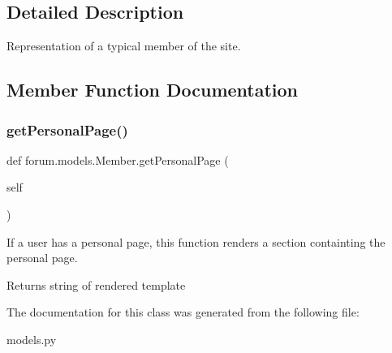 \subsection{Detailed Description}
Representation of a typical member of the site. 

\subsection{Member Function Documentation}
\mbox{\label{classforum_1_1models_1_1_member_ad7b529a832888707060ec31fd05a0809}} 
\subsubsection{\texorpdfstring{get\+Personal\+Page()}{getPersonalPage()}}
{\footnotesize\ttfamily def forum.\+models.\+Member.\+get\+Personal\+Page (\begin{DoxyParamCaption}\item[{}]{self }\end{DoxyParamCaption})}



If a user has a personal page, this function renders a section containting the personal page. 

\begin{DoxyReturn}{Returns}
string of rendered template 
\end{DoxyReturn}


The documentation for this class was generated from the following file\+:\begin{DoxyCompactItemize}
\item 
models.\+py\end{DoxyCompactItemize}
